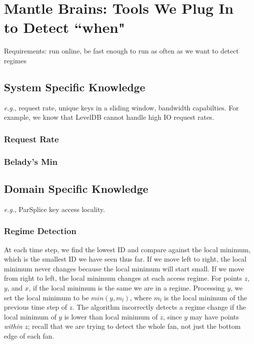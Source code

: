 \section{Mantle Brains: Tools We Plug In to Detect ``when"}
\label{sec:mantle-brains}

Requirements: run online, be fast enough to run as often as we want to detect
regimes

\subsection{System Specific Knowledge}

{\it e.g.}, request rate, unique keys in a sliding window, bandwidth
capabilties. For example, we know that LevelDB cannot handle high IO request
rates.

\subsubsection{Request Rate}

\subsubsection{Belady's Min}

\subsection{Domain Specific Knowledge}

{\it e.g.}, ParSplice key access locality.

\subsubsection{Regime Detection}

At each time step, we find the lowest ID and compare against the local minimum,
which is the smallest ID we have seen thus far. If we move left to right, the
local minimum never changes because the local minimum will start small. If we
move from right to left, the local minimum changes at each access regime.  For
points \(z\), \(y\), and \(x\), if the local minimum is the same we are in a
regime. Processing \(y\), we set the local minimum to be \(min(y, m_l)\), where
\(m_l\) is the local minimum of the previous time step of \(z\). The algorithm
incorrectly detects a regime change if the local minimum of \(y\) is lower than
local minimum of \(z\), since \(y\) may have points {\it within} \(z\); recall
that we are trying to detect the whole fan, not just the bottom edge of each
fan.

